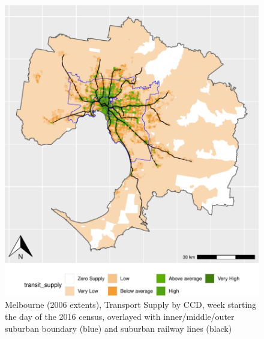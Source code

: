 \documentclass[preprint, 3p,
authoryear]{elsarticle} %
\begin{document}
\begin{figure}
\centering
\includegraphics{Leveraging_GTFS_to_assess_transit_supply_Transport_Geography_files/figure-latex/Greater_Melbourne_CCD_2016_appendix-1.pdf}
\caption{Melbourne (2006 extents), Transport Supply by CCD, week
starting the day of the 2016 census, overlayed with inner/middle/outer
suburban boundary (blue) and suburban railway lines (black)}
\end{figure}
\end{document}
